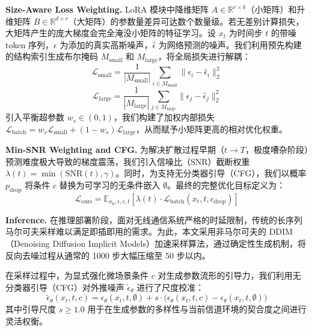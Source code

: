 \documentclass[12pt,a4paper]{article}
\begin{document}
\textbf{Size-Aware Loss Weighting.} LoRA 模块中降维矩阵 $A \in \mathbb{R}^{r \times k}$（小矩阵）和升维矩阵 $B \in \mathbb{R}^{d \times r}$（大矩阵）的参数量差异可达数个数量级。若无差别计算损失，大矩阵产生的庞大梯度会完全淹没小矩阵的特征学习。设 $x_t$ 为时间步 $t$ 的带噪 token 序列，$\epsilon$ 为添加的真实高斯噪声，$\hat{\epsilon}$ 为网络预测的噪声。我们利用预先构建的结构索引生成布尔掩码 $M_{\text{small}}$ 和 $M_{\text{large}}$，将全局损失进行解耦：
\begin{equation}
\mathcal{L}_{\text{small}} = \frac{1}{|M_{\text{small}}|} \sum_{i \in M_{\text{small}}} \|\epsilon_i - \hat{\epsilon}_i\|_2^2
\end{equation}
\begin{equation}
\mathcal{L}_{\text{large}} = \frac{1}{|M_{\text{large}}|} \sum_{j \in M_{\text{large}}} \|\epsilon_j - \hat{\epsilon}_j\|_2^2
\end{equation}
引入平衡超参数 $w_s \in (0, 1)$，我们构建了加权内部损失 $\mathcal{L}_{\text{batch}} = w_s \mathcal{L}_{\text{small}} + (1 - w_s) \mathcal{L}_{\text{large}}$，从而赋予小矩阵更高的相对优化权重。

\textbf{Min-SNR Weighting and CFG.} 为解决扩散过程早期（$t \to T$，极度嘈杂阶段）预测难度极大导致的梯度震荡，我们引入信噪比（SNR）截断权重 $\lambda(t) = \min(\text{SNR}(t), \gamma)$。同时，为支持无分类器引导（CFG），我们以概率 $p_{\text{drop}}$ 将条件 $c$ 替换为可学习的无条件嵌入 $\emptyset$。最终的完整优化目标定义为：
\begin{equation}
\mathcal{L}_{\text{ours}} = \mathbb{E}_{x_0, \epsilon, c, t} \left[ \lambda(t) \cdot \mathcal{L}_{\text{batch}}(x_t, t, c_{\text{drop}}) \right]
\end{equation}

\textbf{Inference.} 在推理部署阶段，面对无线通信系统严格的时延限制，传统的长序列马尔可夫采样难以满足即插即用的需求。为此，本文采用非马尔可夫的 DDIM（Denoising Diffusion Implicit Models）加速采样算法，通过确定性生成机制，将反向去噪过程从通常的 1000 步大幅压缩至 50 步以内。

在采样过程中，为显式强化微场景条件 $c$ 对生成参数流形的引导力，我们利用无分类器引导（CFG）对外推噪声 $\tilde{\epsilon}_\theta$ 进行了尺度校准：
\begin{equation}
\tilde{\epsilon}_\theta(x_t, t, c) = \epsilon_\theta(x_t, t, \emptyset) + s \cdot \big( \epsilon_\theta(x_t, t, c) - \epsilon_\theta(x_t, t, \emptyset) \big)
\end{equation}
其中引导尺度 $s \ge 1.0$ 用于在生成参数的多样性与当前信道环境的契合度之间进行灵活权衡。
\end{document}
